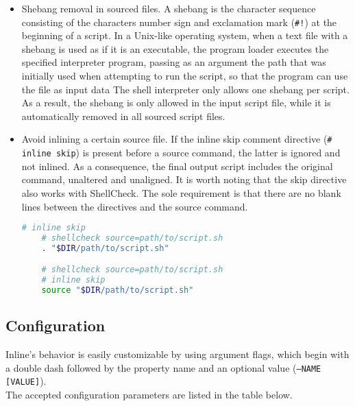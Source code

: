 \begin{itemize}
  \item Shebang removal in sourced files.
    \newline
    A shebang is the character sequence consisting of the characters number sign
    and exclamation mark (\texttt{\#!}) at the beginning of a script. In a Unix-like
    operating system, when a text file with a shebang is used as if it is an
    executable, the program loader executes the specified interpreter program,
    passing as an argument the path that was initially used when attempting to
    run the script, so that the program can use the file as input data\cite{shebang}
    \newline
    The shell interpreter only allows one shebang per script. As a result, the
    shebang is only allowed in the input script file, while it is automatically removed
    in all sourced script files.

  \item Avoid inlining a certain source file. If the inline skip comment
    directive (\texttt{\# inline skip}) is present before a source command, the
    latter is ignored and not inlined. As a consequence, the final output script
    includes the original command, unaltered and unaligned.
    \newline
    It is worth noting that the skip directive also works with ShellCheck. The sole
    requirement is that there are no blank lines between the directives and the source
    command.
    \newline
    \begin{lstlisting}[language=sh, morekeywords={., source}, numbers=none, aboveskip=0pt, belowskip=0pt, abovecaptionskip=0pt, belowcaptionskip=0pt]
    # inline skip
    # shellcheck source=path/to/script.sh
    . "$DIR/path/to/script.sh"

    # shellcheck source=path/to/script.sh
    # inline skip
    source "$DIR/path/to/script.sh"
  \end{lstlisting}
\end{itemize}

\subsection{Configuration}
\label{subsec:corollary_projects_inline_configuration}

Inline's behavior is easily customizable by using argument flags, which begin with
a double dash followed by the property name and an optional value (\texttt{--NAME
[VALUE]}). \\ %
The accepted configuration parameters are listed in the table below.

